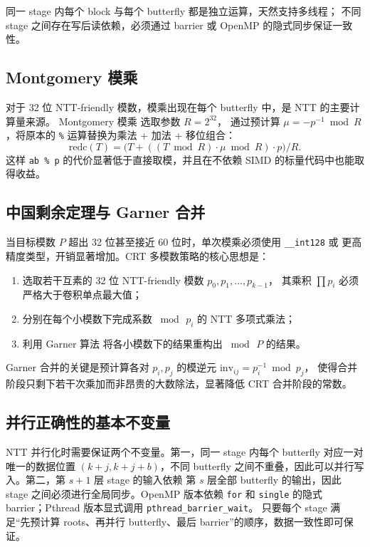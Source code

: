 \documentclass[UTF8,a4paper,10pt]{ctexart}
\begin{document}
同一 stage 内每个 block 与每个 butterfly 都是独立运算，天然支持多线程；
不同 stage 之间存在写后读依赖，必须通过 barrier 或 OpenMP 的隐式同步保证一致性。

\subsection{Montgomery 模乘}

对于 32 位 NTT-friendly 模数，模乘出现在每个 butterfly 中，是 NTT 的主要计算量来源。
Montgomery 模乘\cite{montgomery1985modular} 选取参数 $R = 2^{32}$，
通过预计算 $\mu = -p^{-1} \bmod R$，将原本的 \texttt{\%} 运算替换为乘法 + 加法 + 移位组合：
\[
  \mathrm{redc}(T) = \bigl(T + ((T \bmod R) \cdot \mu \bmod R) \cdot p\bigr) / R.
\]
这样 \texttt{ab \% p} 的代价显著低于直接取模，并且在不依赖 SIMD 的标量代码中也能取得收益。

\subsection{中国剩余定理与 Garner 合并}

当目标模数 $P$ 超出 32 位甚至接近 60 位时，单次模乘必须使用 \texttt{\_\_int128} 或
更高精度类型，开销显著增加。CRT 多模数策略的核心思想是：

\begin{enumerate}
  \item 选取若干互素的 32 位 NTT-friendly 模数 $p_0, p_1, \dots, p_{k-1}$，
        其乘积 $\prod p_i$ 必须严格大于卷积单点最大值；
  \item 分别在每个小模数下完成系数 $\bmod\, p_i$ 的 NTT 多项式乘法；
  \item 利用 Garner 算法\cite{knuth1997art} 将各小模数下的结果重构出 $\bmod\, P$ 的结果。
\end{enumerate}

Garner 合并的关键是预计算各对 $p_i, p_j$ 的模逆元 $\mathrm{inv}_{ij} = p_i^{-1} \bmod p_j$，
使得合并阶段只剩下若干次乘加而非昂贵的大数除法，显著降低 CRT 合并阶段的常数。


\subsection{并行正确性的基本不变量}

NTT 并行化时需要保证两个不变量。第一，同一 stage 内每个 butterfly 对应一对唯一的数据位置
$(k+j, k+j+b)$，不同 butterfly 之间不重叠，因此可以并行写入。第二，第 $s+1$ 层 stage 的输入依赖
第 $s$ 层全部 butterfly 的输出，因此 stage 之间必须进行全局同步。OpenMP 版本依赖 \texttt{for}
和 \texttt{single} 的隐式 barrier；Pthread 版本显式调用 \texttt{pthread\_barrier\_wait}。
只要每个 stage 满足“先预计算 roots、再并行 butterfly、最后 barrier”的顺序，数据一致性即可保证。
\end{document}
